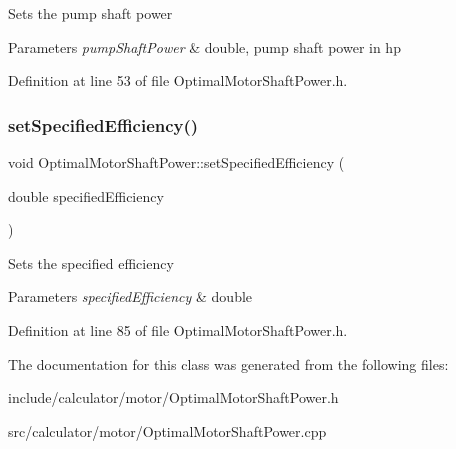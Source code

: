Sets the pump shaft power 
\begin{DoxyParams}{Parameters}
{\em pump\+Shaft\+Power} & double, pump shaft power in hp \\
\hline
\end{DoxyParams}


Definition at line 53 of file Optimal\+Motor\+Shaft\+Power.\+h.

\mbox{\label{class_optimal_motor_shaft_power_a92f7da022e380abbd8cfd308e8aa5e58}} 
\subsubsection{\texorpdfstring{set\+Specified\+Efficiency()}{setSpecifiedEfficiency()}}
{\footnotesize\ttfamily void Optimal\+Motor\+Shaft\+Power\+::set\+Specified\+Efficiency (\begin{DoxyParamCaption}\item[{double}]{specified\+Efficiency }\end{DoxyParamCaption})\hspace{0.3cm}{\ttfamily [inline]}}

Sets the specified efficiency 
\begin{DoxyParams}{Parameters}
{\em specified\+Efficiency} & double \\
\hline
\end{DoxyParams}


Definition at line 85 of file Optimal\+Motor\+Shaft\+Power.\+h.



The documentation for this class was generated from the following files\+:\begin{DoxyCompactItemize}
\item 
include/calculator/motor/Optimal\+Motor\+Shaft\+Power.\+h\item 
src/calculator/motor/Optimal\+Motor\+Shaft\+Power.\+cpp\end{DoxyCompactItemize}
